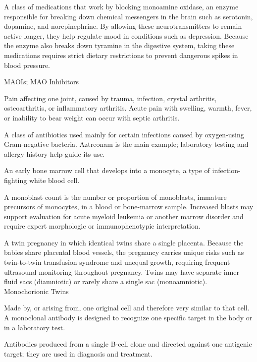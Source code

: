  A class of medications that work by blocking monoamine oxidase, an enzyme responsible for breaking down chemical messengers in the brain such as serotonin, dopamine, and norepinephrine. By allowing these neurotransmitters to remain active longer, they help regulate mood in conditions such as depression. Because the enzyme also breaks down tyramine in the digestive system, taking these medications requires strict dietary restrictions to prevent dangerous spikes in blood pressure.

\synonyms
MAOIs; MAO Inhibitors

 Pain affecting one joint, caused by trauma, infection, crystal arthritis, osteoarthritis, or inflammatory arthritis. Acute pain with swelling, warmth, fever, or inability to bear weight can occur with septic arthritis.

 A class of antibiotics used mainly for certain infections caused by oxygen-using Gram-negative bacteria. Aztreonam is the main example; laboratory testing and allergy history help guide its use.

 An early bone marrow cell that develops into a monocyte, a type of infection-fighting white blood cell.

 A monoblast count is the number or proportion of monoblasts, immature precursors of monocytes, in a blood or bone-marrow sample. Increased blasts may support evaluation for acute myeloid leukemia or another marrow disorder and require expert morphologic or immunophenotypic interpretation.

 A twin pregnancy in which identical twins share a single placenta. Because the babies share placental blood vessels, the pregnancy carries unique risks such as twin-to-twin transfusion syndrome and unequal growth, requiring frequent ultrasound monitoring throughout pregnancy. Twins may have separate inner fluid sacs (diamniotic) or rarely share a single sac (monoamniotic).
\synonyms Monochorionic Twins

 Made by, or arising from, one original cell and therefore very similar to that cell. A monoclonal antibody is designed to recognize one specific target in the body or in a laboratory test.

 Antibodies produced from a single B-cell clone and directed against one antigenic target; they are used in diagnosis and treatment.

